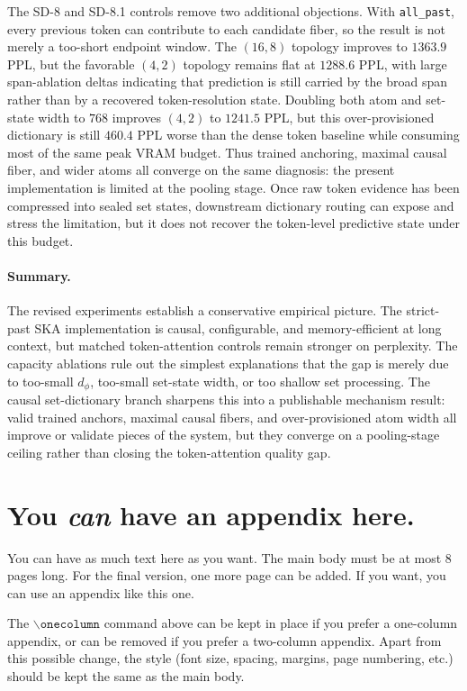 \documentclass{article}
\theoremstyle{plain}
\theoremstyle{definition}
\theoremstyle{remark}
\begin{document}
The SD-8 and SD-8.1 controls remove two additional objections.  With
\texttt{all\_past}, every previous token can contribute to each candidate
fiber, so the result is not merely a too-short endpoint window.  The $(16,8)$
topology improves to $1363.9$ PPL, but the favorable $(4,2)$ topology remains
flat at $1288.6$ PPL, with large span-ablation deltas indicating that prediction
is still carried by the broad span rather than by a recovered token-resolution
state.  Doubling both atom and set-state width to $768$ improves $(4,2)$ to
$1241.5$ PPL, but this over-provisioned dictionary is still $460.4$ PPL worse
than the dense token baseline while consuming most of the same peak VRAM
budget.  Thus trained anchoring, maximal causal fiber, and wider atoms all
converge on the same diagnosis: the present implementation is limited at the
pooling stage.  Once raw token evidence has been compressed into sealed set
states, downstream dictionary routing can expose and stress the limitation, but
it does not recover the token-level predictive state under this budget.

\paragraph{Summary.}
The revised experiments establish a conservative empirical picture.  The
strict-past SKA implementation is causal, configurable, and memory-efficient at
long context, but matched token-attention controls remain stronger on
perplexity.  The capacity ablations rule out the simplest explanations that
the gap is merely due to too-small $d_\phi$, too-small set-state width, or too
shallow set processing.  The causal set-dictionary branch sharpens this into a
publishable mechanism result: valid trained anchors, maximal causal fibers, and
over-provisioned atom width all improve or validate pieces of the system, but
they converge on a pooling-stage ceiling rather than closing the token-attention
quality gap.



\newpage
\appendix
\onecolumn
\section{You \emph{can} have an appendix here.}

You can have as much text here as you want. The main body must be at most $8$
pages long. For the final version, one more page can be added. If you want, you
can use an appendix like this one.

The $\mathtt{\backslash onecolumn}$ command above can be kept in place if you
prefer a one-column appendix, or can be removed if you prefer a two-column
appendix.  Apart from this possible change, the style (font size, spacing,
margins, page numbering, etc.) should be kept the same as the main body.
\end{document}
